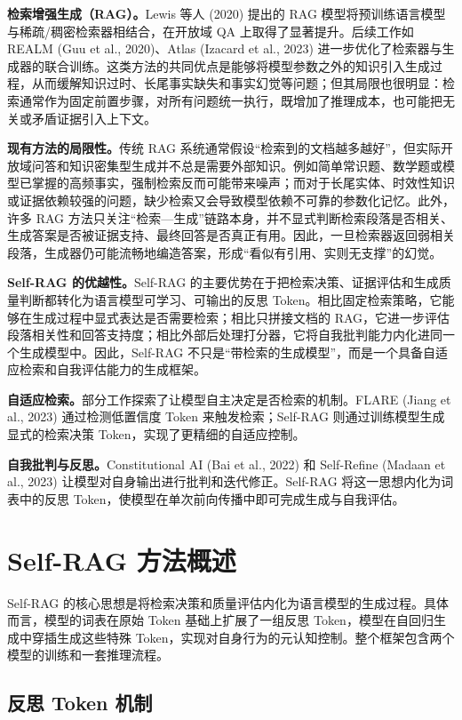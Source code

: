 \documentclass[11pt,a4paper]{article}
\begin{document}
\textbf{检索增强生成（RAG）。}Lewis 等人 (2020) 提出的 RAG 模型将预训练语言模型与稀疏/稠密检索器相结合，在开放域 QA 上取得了显著提升。后续工作如 REALM (Guu et al., 2020)、Atlas (Izacard et al., 2023) 进一步优化了检索器与生成器的联合训练。这类方法的共同优点是能够将模型参数之外的知识引入生成过程，从而缓解知识过时、长尾事实缺失和事实幻觉等问题；但其局限也很明显：检索通常作为固定前置步骤，对所有问题统一执行，既增加了推理成本，也可能把无关或矛盾证据引入上下文。

\textbf{现有方法的局限性。}传统 RAG 系统通常假设“检索到的文档越多越好”，但实际开放域问答和知识密集型生成并不总是需要外部知识。例如简单常识题、数学题或模型已掌握的高频事实，强制检索反而可能带来噪声；而对于长尾实体、时效性知识或证据依赖较强的问题，缺少检索又会导致模型依赖不可靠的参数化记忆。此外，许多 RAG 方法只关注“检索—生成”链路本身，并不显式判断检索段落是否相关、生成答案是否被证据支持、最终回答是否真正有用。因此，一旦检索器返回弱相关段落，生成器仍可能流畅地编造答案，形成“看似有引用、实则无支撑”的幻觉。

\textbf{Self-RAG 的优越性。}Self-RAG 的主要优势在于把检索决策、证据评估和生成质量判断都转化为语言模型可学习、可输出的反思 Token。相比固定检索策略，它能够在生成过程中显式表达是否需要检索；相比只拼接文档的 RAG，它进一步评估段落相关性和回答支持度；相比外部后处理打分器，它将自我批判能力内化进同一个生成模型中。因此，Self-RAG 不只是“带检索的生成模型”，而是一个具备自适应检索和自我评估能力的生成框架。

\textbf{自适应检索。}部分工作探索了让模型自主决定是否检索的机制。FLARE (Jiang et al., 2023) 通过检测低置信度 Token 来触发检索；Self-RAG 则通过训练模型生成显式的检索决策 Token，实现了更精细的自适应控制。

\textbf{自我批判与反思。}Constitutional AI (Bai et al., 2022) 和 Self-Refine (Madaan et al., 2023) 让模型对自身输出进行批判和迭代修正。Self-RAG 将这一思想内化为词表中的反思 Token，使模型在单次前向传播中即可完成生成与自我评估。

\section{Self-RAG 方法概述}
\label{sec:method}

Self-RAG 的核心思想是将检索决策和质量评估内化为语言模型的生成过程。具体而言，模型的词表在原始 Token 基础上扩展了一组反思 Token，模型在自回归生成中穿插生成这些特殊 Token，实现对自身行为的元认知控制。整个框架包含两个模型的训练和一套推理流程。

\subsection{反思 Token 机制}
\label{sec:tokens}
\end{document}
